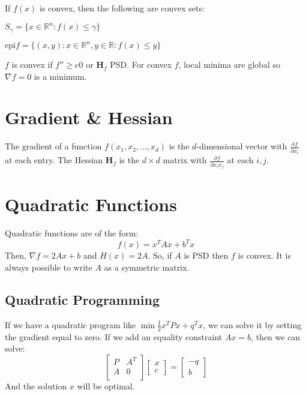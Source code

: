 \documentclass[10pt]{extarticle}
\newcommand*{\pd}[3][]{\ensuremath{\frac{\partial^{#1} #2}{\partial #3}}}
\begin{document}
\begin{multicols*}{2}
If $f(x)$ is convex, then the following are convex sets:
\begin{compactitem}
\item $S_\gamma = \{x \in \mathbb{R}^n: f(x) \leq \gamma\}$
\item $\text{epi} f = \{(x,y): x \in \mathbb{R}^n, y \in \mathbb{R}: f(x) \leq y\}$
	
\end{compactitem}

$f$ is convex if $f'' \geq e  0$ or $\textbf{H}_f$ PSD. For convex $f$, local minima are global so $\nabla f=0$ is a minimum.

\section{Gradient \& Hessian}
The gradient of a function $f(x_1, x_2, \ldots, x_d)$ is the $d$-dimensional vector with $\pd{f}{x_i}$ at each entry.
The Hessian $\mathbf{H}_f$ is the $d \times d$ matrix with $\pd{f}{x_i x_j}$ at each $i, j$.

\section{Quadratic Functions}
Quadratic functions are of the form:
\[ f(x) = x^T A x + b^T x \]
Then, $\nabla f = 2Ax + b$ and $H(x) = 2A$. So, if $A$ is PSD then $f$ is convex. It is always possible to write $A$ as a symmetric matrix.

\subsection{Quadratic Programming}
If we have a quadratic program like $\min \frac{1}{2}x^T P x + q^T x$, we can solve it by setting the gradient equal to zero. If we add an equality constraint $Ax = b$, then we can solve:
\[ \begin{bmatrix}P & A^T \\ A & 0 \\ \end{bmatrix} \begin{bmatrix}x \\ c\end{bmatrix} = \begin{bmatrix}-q \\ b\end{bmatrix} \]
And the solution $x$ will be optimal.



\end{multicols*}
\end{document}
